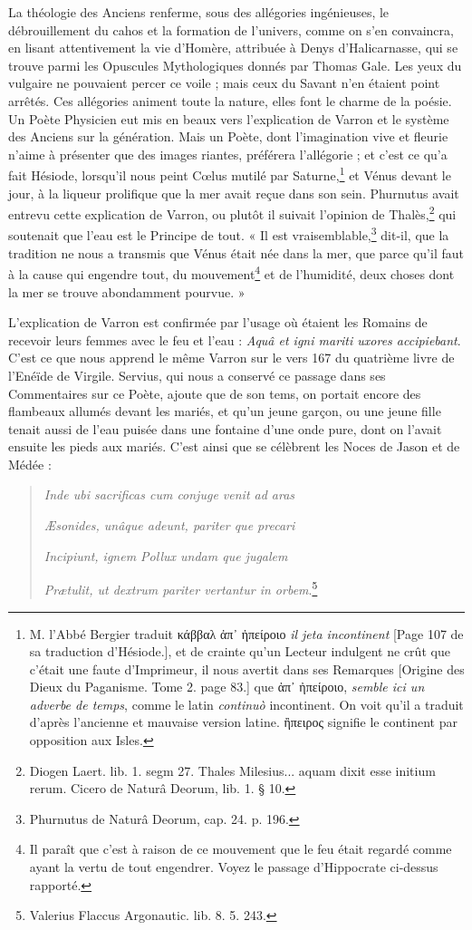 \documentclass[a4paper, 18pt, oneside]{article}
\begin{document}
La théologie des Anciens renferme, sous des allégories ingénieuses, le débrouillement du cahos et la formation de l'univers, comme on s'en convaincra, en lisant attentivement la vie d'Homère, attribuée à Denys d'Halicarnasse, qui se trouve parmi les Opuscules Mythologiques donnés par Thomas Gale. Les yeux du vulgaire ne pouvaient percer ce voile ; mais ceux du Savant n'en étaient point arrêtés. Ces allégories animent toute la nature, elles font le charme de la poésie. Un Poète Physicien eut mis en beaux vers l'explication de Varron et le système des Anciens sur la génération. Mais un Poète, dont l'imagination vive et fleurie n'aime à présenter que des images riantes, préférera l'allégorie ; et c'est ce qu'a fait Hésiode, lorsqu'il nous peint Cœlus mutilé par Saturne,\footnote{M. l'Abbé Bergier traduit κάββαλ ἀπ᾽ ἠπείροιο \emph{il jeta incontinent} [Page 107 de sa traduction d'Hésiode.], et de crainte qu'un Lecteur indulgent ne crût que c'était une faute d'Imprimeur, il nous avertit dans ses Remarques [Origine des Dieux du Paganisme. Tome 2. page 83.] que ἀπ᾽ ἠπείροιο, \emph{semble ici un adverbe de temps}, comme le latin \emph{continuò} incontinent. On voit qu'il a traduit d'après l'ancienne et mauvaise version latine. ἢπειρος signifie le continent par opposition aux Isles.} et Vénus devant le jour, à la liqueur prolifique que la mer avait reçue dans son sein. Phurnutus avait entrevu cette explication de Varron, ou plutôt il suivait l'opinion de Thalès,\footnote{Diogen Laert. lib. 1. segm 27. Thales Milesius... aquam dixit esse initium rerum. Cicero de Naturâ Deorum, lib. 1. § 10.} qui soutenait que l'eau est le Principe de tout. « Il est vraisemblable,\footnote{Phurnutus de Naturâ Deorum, cap. 24. p. 196.} dit-il, que la tradition ne nous a transmis que Vénus était née dans la mer, que parce qu'il faut à la cause qui engendre tout, du mouvement\footnote{Il paraît que c'est à raison de ce mouvement que le feu était regardé comme ayant la vertu de tout engendrer. Voyez le passage d'Hippocrate ci-dessus rapporté.} et de l'humidité, deux choses dont la mer se trouve abondamment pourvue. »

L'explication de Varron est confirmée par l'usage où étaient les Romains de recevoir leurs femmes avec le feu et l'eau : \emph{Aquâ et igni mariti uxores accipiebant}. C'est ce que nous apprend le même Varron sur le vers 167 du quatrième livre de l'Enéïde de Virgile. Servius, qui nous a conservé ce passage dans ses Commentaires sur ce Poète, ajoute que de son tems, on portait encore des flambeaux allumés devant les mariés, et qu'un jeune garçon, ou une jeune fille tenait aussi de l'eau puisée dans une fontaine d'une onde pure, dont on l'avait ensuite les pieds aux mariés. C'est ainsi que se célèbrent les Noces de Jason et de Médée :
\begin{quotation}
\emph{Inde ubi sacrificas cum conjuge venit ad aras}

\emph{Æsonides, unâque adeunt, pariter que precari}

\emph{Incipiunt, ignem Pollux undam que jugalem}

\emph{Prætulit, ut dextrum pariter vertantur in orbem}.\footnote{Valerius Flaccus Argonautic. lib. 8. 5. 243.}
\end{quotation}
\end{document}
